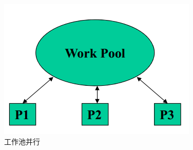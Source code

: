 \documentclass[UTF8,a4paper]{ctexart}
\begin{document}
\begin{figure}[H]
  \centering
  \includegraphics[scale = 0.3]{assets/ParallelComputing_12327.png}
  \caption{工作池并行}
\end{figure}
\end{document}

